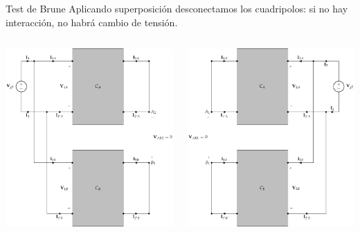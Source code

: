 \documentclass[xcolor={usenames,svgnames,dvipsnames}]{beamer}
\begin{document}
\begin{frame}[label={sec:org54eecf6},plain]{Test de Brune}
Aplicando superposición desconectamos los cuadripolos: \alert{si no hay interacción, no habrá cambio de tensión}.
\begin{columns}
\begin{column}{0.65\columnwidth}
\begin{center}
\includegraphics[width=.9\linewidth]{../figs/paralelo-paralelo-brune-entrada2.pdf}
\end{center}
\end{column}
\begin{column}{0.65\columnwidth}
\begin{center}
\includegraphics[width=.9\linewidth]{../figs/paralelo-paralelo-brune-salida2.pdf}
\end{center}
\end{column}
\end{columns}
\end{frame}
\end{document}

